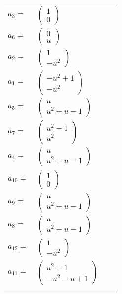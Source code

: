 \documentclass[1p]{elsarticle_modified}
\theoremstyle{definition}
\begin{document}
\begin{tabular}{m{7pt} m{180pt} m{7pt} m{180pt} }
\flushright $a_{3}=$&$\begin{pmatrix}1\\0\end{pmatrix}$ \\
\flushright $a_{6}=$&$\begin{pmatrix}0\\u\end{pmatrix}$ \\
\flushright $a_{2}=$&$\begin{pmatrix}1\\- u^2\end{pmatrix}$ \\
\flushright $a_{1}=$&$\begin{pmatrix}- u^2+1\\- u^2\end{pmatrix}$ \\
\flushright $a_{5}=$&$\begin{pmatrix}u\\u^2+u-1\end{pmatrix}$ \\
\flushright $a_{7}=$&$\begin{pmatrix}u^2-1\\u^2\end{pmatrix}$ \\
\flushright $a_{4}=$&$\begin{pmatrix}u\\u^2+u-1\end{pmatrix}$ \\
\flushright $a_{10}=$&$\begin{pmatrix}1\\0\end{pmatrix}$ \\
\flushright $a_{9}=$&$\begin{pmatrix}u\\u^2+u-1\end{pmatrix}$ \\
\flushright $a_{8}=$&$\begin{pmatrix}u\\u^2+u-1\end{pmatrix}$ \\
\flushright $a_{12}=$&$\begin{pmatrix}1\\- u^2\end{pmatrix}$ \\
\flushright $a_{11}=$&$\begin{pmatrix}u^2+1\\- u^2- u+1\end{pmatrix}$\\&\end{tabular}
\end{document}
